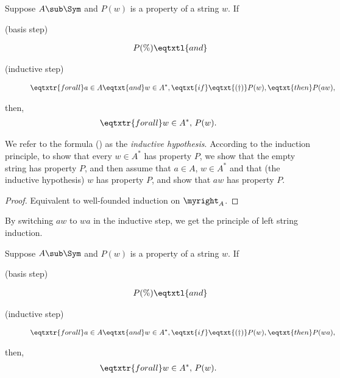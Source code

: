 %
%
\begin{theorem}
Suppose $A\sub\Sym$ and $P(w)$ is a property of a string $w$.
If
\begin{description}
\item[\quad(basis step)]
\begin{gather*}
P(\%) \eqtxtl{and}
\end{gather*}
\item[\quad(inductive step)]
\begin{gather*}
\eqtxtr{for all}a\in A\eqtxt{and}w\in A^*,
\eqtxt{if}\eqtxt{\rm(\dag)} P(w),\eqtxt{then}P(aw),
\end{gather*}
\end{description}
then,
\begin{gather*}
\eqtxtr{for all}w\in A^*,\,P(w) .
\end{gather*}
\end{theorem}

We refer to the formula (\dag) as the \emph{inductive hypothesis}.
According to the induction principle, to show that every $w\in A^*$
has property $P$, we show that the empty string has property $P$, and
then assume that $a\in A$, $w\in A^*$ and that (the inductive
hypothesis) $w$ has property $P$, and show that $aw$ has property
$P$.

\begin{proof}
Equivalent to well-founded induction on $\myright_A$.
\end{proof}

By switching $aw$ to $wa$ in the inductive step, we get the principle
of left string induction.

%
%
\begin{theorem}
Suppose $A\sub\Sym$ and $P(w)$ is a property of a string $w$.
If
\begin{description}
\item[\quad(basis step)]
\begin{gather*}
P(\%) \eqtxtl{and}
\end{gather*}
\item[\quad(inductive step)]
\begin{gather*}
\eqtxtr{for all}a\in A\eqtxt{and}w\in A^*,
\eqtxt{if} \eqtxt{\rm(\dag)} P(w),\eqtxt{then}P(wa),
\end{gather*}
\end{description}
then,
\begin{gather*}
\eqtxtr{for all}w\in A^*,\,P(w) .
\end{gather*}
\end{theorem}

